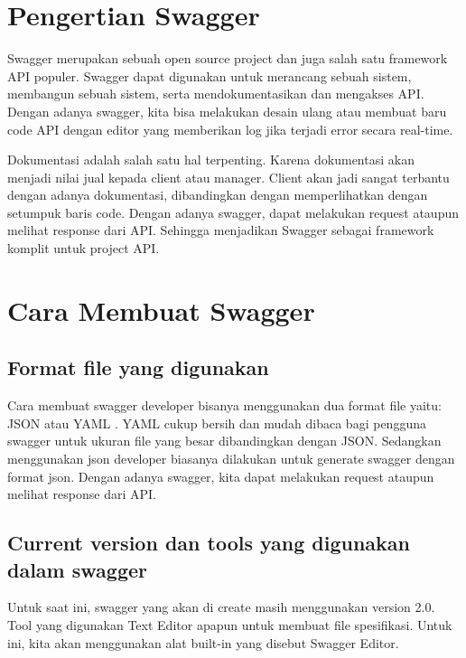 \documentclass[12pt,a4paper]{article}
\begin{document}
\section{Pengertian Swagger}
Swagger merupakan sebuah open source project dan juga salah satu framework API populer. Swagger dapat digunakan untuk merancang sebuah sistem, membangun sebuah sistem, serta mendokumentasikan dan mengakses API. Dengan adanya swagger, kita bisa melakukan desain ulang atau membuat baru code API dengan editor yang memberikan log jika terjadi error secara real-time.

Dokumentasi adalah salah satu hal terpenting. Karena dokumentasi akan menjadi nilai jual kepada client atau manager. Client akan jadi sangat terbantu dengan adanya dokumentasi, dibandingkan dengan memperlihatkan dengan setumpuk baris code. Dengan adanya swagger, dapat melakukan request ataupun melihat response dari API. Sehingga menjadikan Swagger sebagai framework komplit untuk project API.
\section{Cara Membuat Swagger}
\subsection{Format file yang digunakan}
Cara membuat swagger developer bisanya menggunakan dua format file yaitu: JSON atau YAML . YAML cukup bersih dan mudah dibaca bagi pengguna swagger untuk ukuran file yang besar dibandingkan dengan JSON. Sedangkan menggunakan json developer biasanya dilakukan untuk generate swagger dengan format json. Dengan adanya swagger, kita dapat melakukan request ataupun melihat response dari API.
\subsection{Current version dan tools yang digunakan dalam swagger}
Untuk saat ini, swagger yang akan di create masih menggunakan version 2.0.
Tool yang digunakan Text Editor apapun untuk membuat file spesifikasi. Untuk ini, kita akan menggunakan alat built-in yang disebut Swagger Editor.
\end{document}
